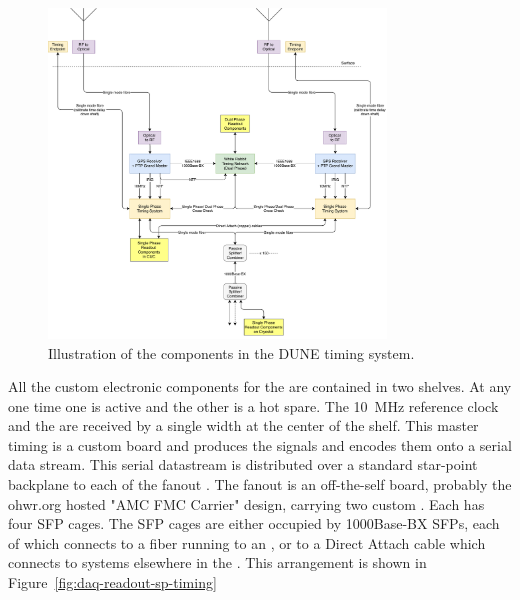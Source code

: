 \documentclass{article}
\begin{document}

\begin{figure}[H]
\includegraphics[width=0.8\textwidth]{daq-timing-block-diagram-tdr_2nov18.pdf}
\caption{Illustration of the components in the DUNE timing system.}
\label{fig:daq-readout-timing}
\end{figure}


All the custom electronic components for the  are contained in two
 shelves. At any one time one is active and the other is a
hot spare. The \SI{10}{\MHz} reference clock and the  are received
by a single width  at the center of the  shelf. This
master timing  is a custom board and produces the  signals and encodes them onto a
serial data stream. This serial datastream is distributed over a
standard star-point backplane to each of the fanout . The fanout  is an off-the-self board, probably the ohwr.org hosted "AMC FMC Carrier" design, carrying two custom . Each  has four SFP cages. The SFP cages are either occupied by
1000Base-BX SFPs, each of which connects to a fiber running to an ,
or to a Direct Attach cable which connects to systems elsewhere in the
. This
arrangement is shown in Figure~\ref{fig:daq-readout-sp-timing}
\end{document}
